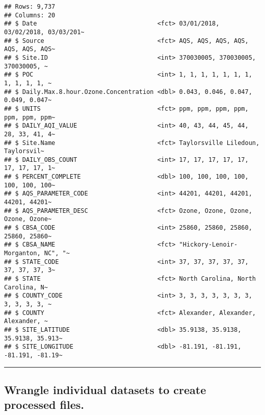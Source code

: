 \documentclass[
]{article}
\begin{document}
\begin{verbatim}
## Rows: 9,737
## Columns: 20
## $ Date                                 <fct> 03/01/2018, 03/02/2018, 03/03/201~
## $ Source                               <fct> AQS, AQS, AQS, AQS, AQS, AQS, AQS~
## $ Site.ID                              <int> 370030005, 370030005, 370030005, ~
## $ POC                                  <int> 1, 1, 1, 1, 1, 1, 1, 1, 1, 1, 1, ~
## $ Daily.Max.8.hour.Ozone.Concentration <dbl> 0.043, 0.046, 0.047, 0.049, 0.047~
## $ UNITS                                <fct> ppm, ppm, ppm, ppm, ppm, ppm, ppm~
## $ DAILY_AQI_VALUE                      <int> 40, 43, 44, 45, 44, 28, 33, 41, 4~
## $ Site.Name                            <fct> Taylorsville Liledoun, Taylorsvil~
## $ DAILY_OBS_COUNT                      <int> 17, 17, 17, 17, 17, 17, 17, 17, 1~
## $ PERCENT_COMPLETE                     <dbl> 100, 100, 100, 100, 100, 100, 100~
## $ AQS_PARAMETER_CODE                   <int> 44201, 44201, 44201, 44201, 44201~
## $ AQS_PARAMETER_DESC                   <fct> Ozone, Ozone, Ozone, Ozone, Ozone~
## $ CBSA_CODE                            <int> 25860, 25860, 25860, 25860, 25860~
## $ CBSA_NAME                            <fct> "Hickory-Lenoir-Morganton, NC", "~
## $ STATE_CODE                           <int> 37, 37, 37, 37, 37, 37, 37, 37, 3~
## $ STATE                                <fct> North Carolina, North Carolina, N~
## $ COUNTY_CODE                          <int> 3, 3, 3, 3, 3, 3, 3, 3, 3, 3, 3, ~
## $ COUNTY                               <fct> Alexander, Alexander, Alexander, ~
## $ SITE_LATITUDE                        <dbl> 35.9138, 35.9138, 35.9138, 35.913~
## $ SITE_LONGITUDE                       <dbl> -81.191, -81.191, -81.191, -81.19~
\end{verbatim}

\begin{center}\rule{0.5\linewidth}{0.5pt}\end{center}

\hypertarget{wrangle-individual-datasets-to-create-processed-files.-1}{%
\subsection{Wrangle individual datasets to create processed
files.}\label{wrangle-individual-datasets-to-create-processed-files.-1}}
\end{document}
